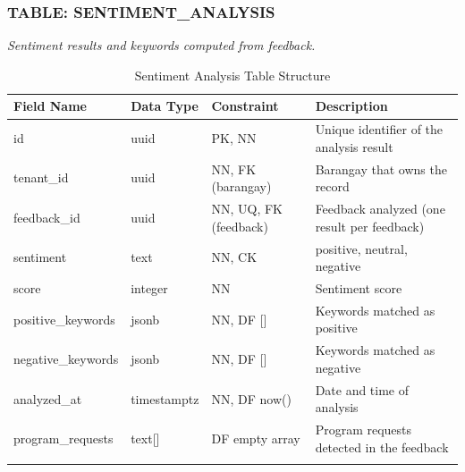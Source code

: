 \subsubsection*{TABLE: SENTIMENT\_ANALYSIS}
\noindent\textit{Sentiment results and keywords computed from feedback.}
\begin{longtable}{|p{3.2cm}|p{2.2cm}|p{3.2cm}|p{5.4cm}|}
\hline
\textbf{Field Name} & \textbf{Data Type} & \textbf{Constraint} & \textbf{Description} \\ \hline
\endhead
\hline \endfoot
\hline \endlastfoot
id & uuid & PK, NN & Unique identifier of the analysis result \\ \hline
tenant\_id & uuid & NN, FK (barangay) & Barangay that owns the record \\ \hline
feedback\_id & uuid & NN, UQ, FK (feedback) & Feedback analyzed (one result per feedback) \\ \hline
sentiment & text & NN, CK & positive, neutral, negative \\ \hline
score & integer & NN & Sentiment score \\ \hline
positive\_keywords & jsonb & NN, DF [] & Keywords matched as positive \\ \hline
negative\_keywords & jsonb & NN, DF [] & Keywords matched as negative \\ \hline
analyzed\_at & timestamptz & NN, DF now() & Date and time of analysis \\ \hline
program\_requests & text[] & DF empty array & Program requests detected in the feedback \\ \hline
\caption{Sentiment Analysis Table Structure}
\label{tab:sentiment_analysis}
\end{longtable}
\vspace{3mm}

